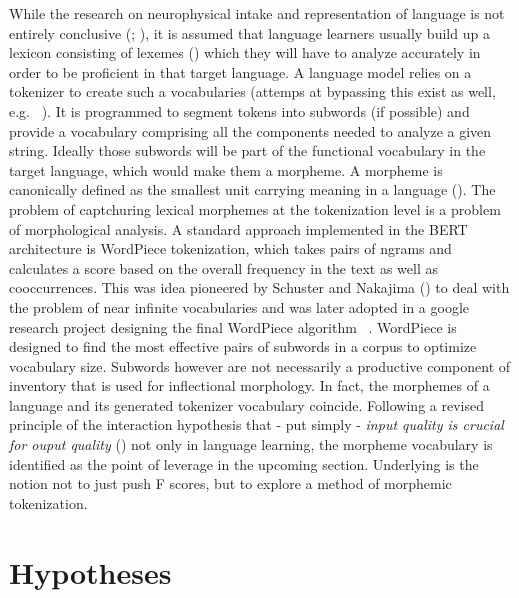 While the research on neurophysical intake and representation of language is not entirely conclusive (\textcite[1--3]{n400}; \textcite{L2morphology}), it is assumed that language learners usually build up a lexicon consisting of lexemes (\cite[82 -- 100]{brennan2022language}) which they will have to analyze accurately in order to be proficient in that target language.
A language model relies on a tokenizer to create such a vocabularies (attemps at bypassing this exist as well, e.g. \ \textcite{handsfreesegmentation}).
It is programmed to segment tokens into subwords (if possible) and provide a vocabulary comprising all the components needed to analyze a given string.
Ideally those subwords will be part of the functional vocabulary in the target language, which would make them a morpheme.
A morpheme is canonically defined as the smallest unit carrying meaning in a language (\cite{morpheme}).
The problem of captchuring lexical morphemes at the tokenization level is a problem of morphological analysis.
A standard approach implemented in the BERT architecture is WordPiece tokenization, which takes pairs of ngrams and calculates a score based on the overall frequency in the text as well as cooccurrences.
This was idea pioneered by Schuster and Nakajima (\citeyear{WORDPIECEOG}) to deal with the problem of near infinite vocabularies and was later adopted in a google research project designing the final WordPiece algorithm ~\cite{WORDPIECEGOOGLE}.
WordPiece is designed to find the most effective pairs of subwords in a corpus to optimize vocabulary size.
Subwords however are not necessarily a productive component of inventory that is used for inflectional morphology.
In fact, the morphemes of a language and its generated tokenizer vocabulary  coincide.
Following a revised principle of the interaction hypothesis that - put simply - \textit{input quality is crucial for ouput quality} (\cite[114]{inputoutput}) not only in language learning, the morpheme vocabulary is identified as the point of leverage in the upcoming section.
Underlying is the notion not to just push F scores, but to explore a method of morphemic tokenization.


\section{Hypotheses}
\label{sec:hypothesis}

